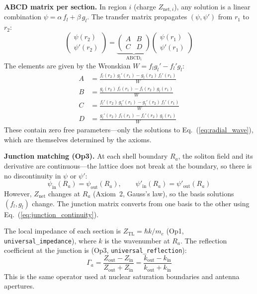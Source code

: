 \noindent\textbf{ABCD matrix per section.}
In region $i$ (charge $Z_{\text{net},i}$), any
solution is a linear combination
$\psi = \alpha\,f_l + \beta\,g_l$.  The transfer
matrix propagates $(\psi, \psi')$ from $r_1$ to
$r_2$:
\begin{equation}
    \begin{pmatrix} \psi(r_2) \\ \psi'(r_2)
    \end{pmatrix}
    = \underbrace{\begin{pmatrix} A & B \\ C & D
    \end{pmatrix}}_{\text{ABCD}_i}
    \begin{pmatrix} \psi(r_1) \\ \psi'(r_1)
    \end{pmatrix}
    \label{eq:abcd_section}
\end{equation}
The elements are given by the Wronskian
$W = f_l g_l' - f_l' g_l$:
\begin{align}
    A &= \frac{f_l(r_2)\,g_l'(r_1) -
         g_l(r_2)\,f_l'(r_1)}{W} \nonumber \\
    B &= \frac{g_l(r_2)\,f_l(r_1) -
         f_l(r_2)\,g_l(r_1)}{W} \nonumber \\
    C &= \frac{f_l'(r_2)\,g_l'(r_1) -
         g_l'(r_2)\,f_l'(r_1)}{W} \nonumber \\
    D &= \frac{g_l'(r_2)\,f_l(r_1) -
         f_l'(r_2)\,g_l(r_1)}{W}
    \label{eq:abcd_elements}
\end{align}
These contain zero free parameters---only the
solutions to Eq.~(\ref{eq:radial_wave}), which
are themselves determined by the axioms.

\noindent\textbf{Junction matching (Op3).}
At each shell boundary $R_a$, the soliton field and
its derivative are continuous---the lattice does not
break at the boundary, so there is no discontinuity
in $\psi$ or $\psi'$:
\begin{equation}
    \psi_{\text{in}}(R_a) = \psi_{\text{out}}(R_a),
    \qquad
    \psi'_{\text{in}}(R_a) = \psi'_{\text{out}}(R_a)
    \label{eq:junction_continuity}
\end{equation}
However, $Z_{\text{net}}$ changes at $R_a$
(Axiom~2, Gauss's law), so the basis solutions
$(f_l, g_l)$ change.  The junction matrix converts
from one basis to the other using
Eq.~(\ref{eq:junction_continuity}).

The local impedance of each section is
$Z_{\text{TL}} = \hbar k / m_e$
(Op1, \texttt{universal\_impedance}),
where $k$ is the wavenumber at $R_a$.  The
reflection coefficient at the junction is
(Op3, \texttt{universal\_reflection}):
\begin{equation}
    \Gamma_a = \frac{Z_{\text{out}} -
    Z_{\text{in}}}{Z_{\text{out}} +
    Z_{\text{in}}} = \frac{k_{\text{out}} -
    k_{\text{in}}}{k_{\text{out}} +
    k_{\text{in}}}
    \label{eq:junction_gamma}
\end{equation}
This is the same operator used at nuclear
saturation boundaries and antenna apertures.

